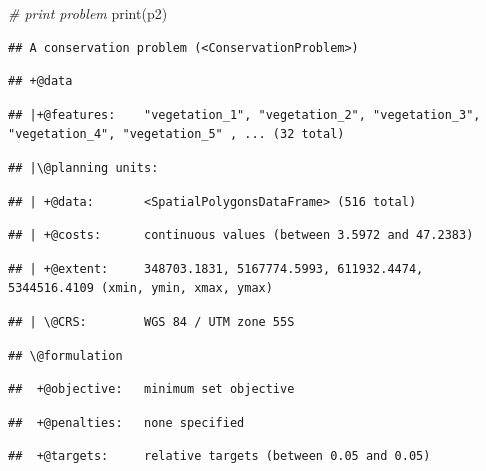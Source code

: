 \documentclass[
  12pt,
]{book}
\newenvironment{Shaded}{\begin{snugshade}}{\end{snugshade}}
\newcommand{\CommentTok}[1]{\textcolor[rgb]{0.56,0.35,0.01}{\textit{#1}}}
\newcommand{\FunctionTok}[1]{\textcolor[rgb]{0.00,0.00,0.00}{#1}}
\newcommand{\NormalTok}[1]{#1}
\begin{document}
\begin{Shaded}
\begin{Highlighting}[]
\CommentTok{\# print problem}
\FunctionTok{print}\NormalTok{(p2)}
\end{Highlighting}
\end{Shaded}

\begin{verbatim}
## A conservation problem (<ConservationProblem>)
\end{verbatim}

\begin{verbatim}
## +@data
\end{verbatim}

\begin{verbatim}
## |+@features:    "vegetation_1", "vegetation_2", "vegetation_3", "vegetation_4", "vegetation_5" , ... (32 total)
\end{verbatim}

\begin{verbatim}
## |\@planning units:
\end{verbatim}

\begin{verbatim}
## | +@data:       <SpatialPolygonsDataFrame> (516 total)
\end{verbatim}

\begin{verbatim}
## | +@costs:      continuous values (between 3.5972 and 47.2383)
\end{verbatim}

\begin{verbatim}
## | +@extent:     348703.1831, 5167774.5993, 611932.4474, 5344516.4109 (xmin, ymin, xmax, ymax)
\end{verbatim}

\begin{verbatim}
## | \@CRS:        WGS 84 / UTM zone 55S
\end{verbatim}

\begin{verbatim}
## \@formulation
\end{verbatim}

\begin{verbatim}
##  +@objective:   minimum set objective
\end{verbatim}

\begin{verbatim}
##  +@penalties:   none specified
\end{verbatim}

\begin{verbatim}
##  +@targets:     relative targets (between 0.05 and 0.05)
\end{verbatim}
\end{document}
